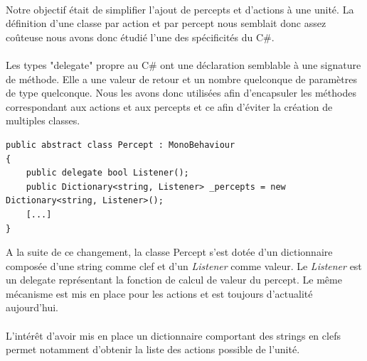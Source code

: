 \documentclass{report}
\begin{document}
\paragraph{}
Notre objectif était de simplifier l'ajout de percepts et d'actions à une unité. La définition d'une classe par action et par percept nous semblait donc assez coûteuse nous avons donc étudié l'une des spécificités du C\#.
\paragraph{}
Les types "delegate" propre au C\# ont une déclaration semblable à une signature de méthode.
Elle a une valeur de retour et un nombre quelconque de paramètres de type quelconque.
Nous les avons donc utilisées afin d'encapsuler les méthodes correspondant aux actions et aux percepts et ce afin d'éviter la création de multiples classes.

\begin{lstlisting}[language={[Sharp]C},label={lst:PerceptScript}, caption=  Extrait du code du script Percept.cs]
public abstract class Percept : MonoBehaviour
{
    public delegate bool Listener();
    public Dictionary<string, Listener> _percepts = new Dictionary<string, Listener>();
    [...]
}
\end{lstlisting}

A la suite de ce changement, la classe Percept s'est dotée d'un dictionnaire composée d'une string comme clef et d'un \textit{Listener} comme valeur. Le \textit{Listener} est un delegate représentant la fonction de calcul de valeur du percept. Le même mécanisme est mis en place pour les actions et est toujours d'actualité aujourd'hui.
\paragraph{}L’intérêt d'avoir mis en place un dictionnaire comportant des strings en clefs permet notamment d'obtenir la liste des actions possible de l'unité.
\end{document}
